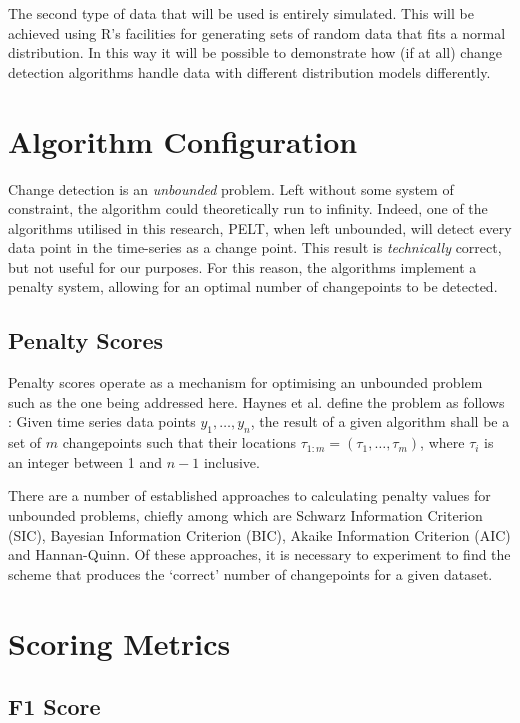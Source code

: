 \documentclass{uvamscse}	%
\begin{document}
The second type of data that will be used is entirely simulated. This will be achieved using R's facilities for generating sets of random data that fits a normal distribution. In this way it will be possible to demonstrate how (if at all) change detection algorithms handle data with different distribution models differently.

\section{Algorithm Configuration}

Change detection is an \emph{unbounded} problem. Left without some system of constraint, the algorithm could theoretically run to infinity. Indeed, one of the algorithms utilised in this research, PELT, when left unbounded, will detect every data point in the time-series as a change point. This result is \textit{technically} correct, but not useful for our purposes. For this reason, the algorithms implement a penalty system, allowing for an optimal number of changepoints to be detected.

\subsection{Penalty Scores}

Penalty scores operate as a mechanism for optimising an unbounded problem such as the one being addressed here. Haynes et al. define the problem as follows \cite{Haynes2014}: Given time series data points $y_1,\ldots,y_n$, the result of a given algorithm shall be a set of $m$ changepoints such that their locations $\tau_{1:m} = (\tau_1,\ldots,\tau_m)$, where $\tau_i$ is an integer between 1 and $n-1$ inclusive.

There are a number of established approaches to calculating penalty values for unbounded problems, chiefly among which are Schwarz Information Criterion (SIC), Bayesian Information Criterion (BIC), Akaike Information Criterion (AIC) and Hannan-Quinn. Of these approaches, it is necessary to experiment to find the scheme that produces the `correct' number of changepoints for a given dataset.

\section{Scoring Metrics}

\subsection{F1 Score}
\end{document}
